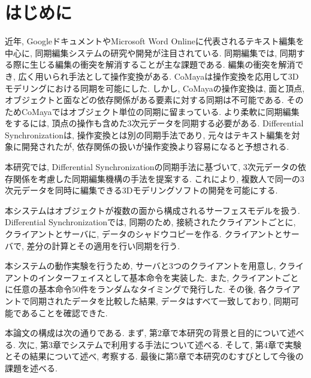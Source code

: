 \chapter{はじめに}
近年, Googleドキュメント\cite{GOOGLEDOCS}やMicrosoft Word Online\cite{WORDONLINE}に代表されるテキスト編集を中心に, 同期編集システムの研究や開発が注目されている.
同期編集では, 同期する際に生じる編集の衝突を解消することが主な課題である.
編集の衝突を解消でき, 広く用いられ手法として操作変換がある.
CoMaya\cite{COMAYA}は操作変換を応用して3Dモデリングにおける同期を可能にした.
しかし, CoMayaの操作変換は, 面と頂点, オブジェクトと面などの依存関係がある要素に対する同期は不可能である.
そのためCoMayaではオブジェクト単位の同期に留まっている.
より柔軟に同期編集をするには, 頂点の操作も含めた3次元データを同期する必要がある.
Differential Synchronization\cite{DS}は, 操作変換とは別の同期手法であり, 元々はテキスト編集を対象に開発されたが, 依存関係の扱いが操作変換より容易になると予想される.
\par
本研究では, Differential Synchronizationの同期手法に基づいて, 3次元データの依存関係を考慮した同期編集機構の手法を提案する.
これにより, 複数人で同一の3次元データを同時に編集できる3Dモデリングソフトの開発を可能にする.
\par
本システムはオブジェクトが複数の面から構成されるサーフェスモデルを扱う. Differential Synchronizationでは, 同期のため, 接続されたクライアントごとに, クライアントとサーバに, データのシャドウコピーを作る. クライアントとサーバで, 差分の計算とその適用を行い同期を行う.
\par
本システムの動作実験を行うため, サーバと3つのクライアントを用意し, クライアントのインターフェイスとして基本命令を実装した.
また, クライアントごとに任意の基本命令50件をランダムなタイミングで発行した.
 その後, 各クライアントで同期されたデータを比較した結果, データはすべて一致しており, 同期可能であることを確認できた.
\par
本論文の構成は次の通りである. まず, 第2章で本研究の背景と目的について述べる. 次に, 第3章でシステムで利用する手法について述べる. そして, 第4章で実験とその結果について述べ, 考察する. 最後に第5章で本研究のむすびとして今後の課題を述べる.
